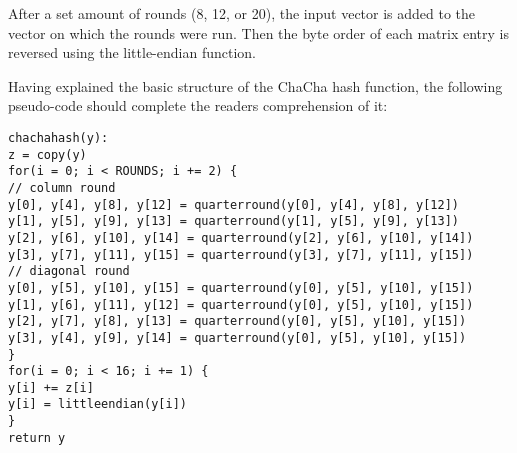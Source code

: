 \noindent
After a set amount of rounds (8, 12, or 20), the input vector is added to the vector on which the rounds were run. Then the byte order of each matrix entry is reversed using the little-endian function.

Having explained the basic structure of the ChaCha hash function, the following pseudo-code should complete the readers comprehension of it:

\begin{center}
\begin{minipage}{\linewidth}
\texttt{chachahash(y):} \\
\hspace*{2em}\texttt{z = copy(y)}\\
\hspace*{2em}\texttt{for(i = 0; i < ROUNDS; i += 2) \{}\\
\hspace*{4em}\texttt{// column round}\\
\hspace*{4em}\texttt{y[0], y[4], y[8], y[12] = quarterround(y[0], y[4], y[8], y[12])}\\
\hspace*{4em}\texttt{y[1], y[5], y[9], y[13] = quarterround(y[1], y[5], y[9], y[13])}\\
\hspace*{4em}\texttt{y[2], y[6], y[10], y[14] = quarterround(y[2], y[6], y[10], y[14])}\\
\hspace*{4em}\texttt{y[3], y[7], y[11], y[15] = quarterround(y[3], y[7], y[11], y[15])}\\
\hspace*{4em}\texttt{// diagonal round}\\
\hspace*{4em}\texttt{y[0], y[5], y[10], y[15] = quarterround(y[0], y[5], y[10], y[15])}\\
\hspace*{4em}\texttt{y[1], y[6], y[11], y[12] = quarterround(y[0], y[5], y[10], y[15])}\\
\hspace*{4em}\texttt{y[2], y[7], y[8], y[13] = quarterround(y[0], y[5], y[10], y[15])}\\
\hspace*{4em}\texttt{y[3], y[4], y[9], y[14] = quarterround(y[0], y[5], y[10], y[15])}\\
\hspace*{2em}\texttt{\}}\\
\hspace*{2em}\texttt{for(i = 0; i < 16; i += 1) \{}\\
\hspace*{4em}\texttt{y[i] += z[i]}\\
\hspace*{4em}\texttt{y[i] = littleendian(y[i])}\\
\hspace*{2em}\texttt{\}}\\
\hspace*{2em}\texttt{return y}
\end{minipage}
\end{center}

